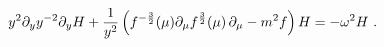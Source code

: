 \begin{equation}
y^2 \partial_y y^{-2} \partial_y H + {1\over y^2}\left( f^{-{3\over2}}(\mu) 
\partial_\mu f^{{3\over 2}}(\mu)\,\partial_\mu -m^2f\right)H= -\omega^2 H\ .
\label{scalar}
\end{equation}

